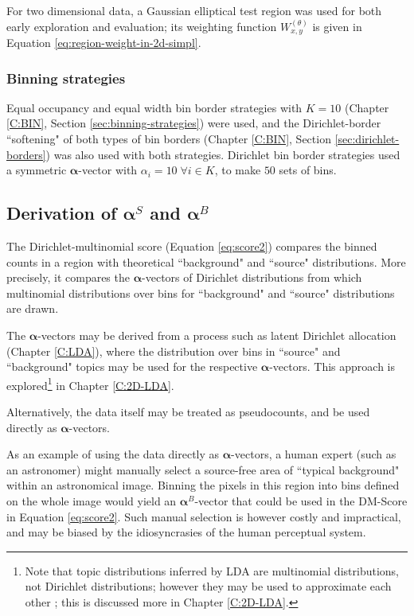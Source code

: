 For two dimensional data, a Gaussian elliptical test region was used for both early exploration and evaluation; its weighting function $W_{x,y}^{(\theta)}$ is given in Equation \ref{eq:region-weight-in-2d-simpl}.

\subsubsection{Binning strategies}
Equal occupancy and equal width bin border strategies with $K=10$ (Chapter \ref{C:BIN}, Section \ref{sec:binning-strategies}) were used, and the Dirichlet-border ``softening" of both types of bin borders (Chapter \ref{C:BIN}, Section \ref{sec:dirichlet-borders}) was also used with both strategies. Dirichlet bin border strategies used a symmetric $\boldsymbol{\alpha}$-vector with $\alpha_i = 10 \; \forall i \in K$, to make $50$ sets of bins.

\subsection{Derivation of $\boldsymbol{\alpha}^S$ and $\boldsymbol{\alpha}^B$}\label{sec:alphas}
The Dirichlet-multinomial score (Equation \ref{eq:score2}) compares the binned counts in a region with theoretical ``background" and ``source" distributions. More precisely, it compares the $\boldsymbol{\alpha}$-vectors of Dirichlet distributions from which multinomial distributions over bins for ``background" and ``source" distributions are drawn.

The $\boldsymbol{\alpha}$-vectors may be derived from a process such as latent Dirichlet allocation (Chapter \ref{C:LDA}), where the distribution over bins in ``source" and ``background" topics may be used for the respective $\boldsymbol{\alpha}$-vectors. This approach is explored\footnote{Note that topic distributions inferred by LDA are multinomial distributions, not Dirichlet distributions; however they may be used to approximate each other \cite{johnson1960approximation,johnson1997discrete}; this is discussed more in Chapter \ref{C:2D-LDA}.} in Chapter \ref{C:2D-LDA}.

Alternatively, the data itself may be treated as pseudocounts, and be used directly as $\boldsymbol{\alpha}$-vectors. 

As an example of using the data directly as $\boldsymbol{\alpha}$-vectors, a human expert (such as an astronomer) might manually select a source-free area of ``typical background" within an astronomical image. Binning the pixels in this region into bins defined on the whole image would yield an $\boldsymbol{\alpha}^B$-vector that could be used in the DM-Score in Equation \ref{eq:score2}. Such manual selection is however costly and impractical, and may be biased by the idiosyncrasies of the human perceptual system.

